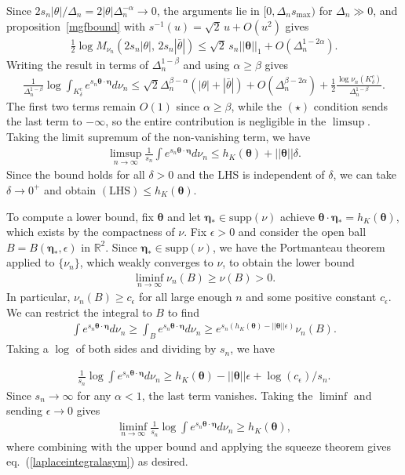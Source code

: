 \documentclass[a4paper,11pt]{article}
\theoremstyle{plain}
\theoremstyle{definition}
\theoremstyle{remark}
\newcommand{\bs}[1]{\boldsymbol{#1}}
\newcommand{\ba}{\begin{equation} \begin{aligned}}
\newcommand{\ea}{\end{aligned} \end{equation}}
\newcommand{\De}{\Delta}
\begin{document}
\begin{appendix}
Since $2s_n|\theta|/\De_n = 2|\theta|\De_n^{-\alpha} \to 0$, the arguments lie in $[0,\De_n s_{\max})$ for $\De_n \gg 0$, and proposition~\ref{mgfbound} with $s^{-1}(u) = \sqrt{2}\,u + O(u^2)$ gives
\ba
\frac{1}{2}\log M_{\nu_n}(2s_n|\theta|,\,2s_n|\bar{\theta}|) \leq \sqrt{2}\,s_n||\bs{\theta}||_1 + O(\De_n^{1-2\alpha}).
\ea
Writing the result in terms of $\De_n^{1-\beta}$ and using $\alpha \geq \beta$ gives
\ba
\frac{1}{\De_n^{1-\beta}}\log\int_{K_\delta^c} e^{s_n \bs{\theta}\cdot\bs{\eta}} d\nu_n \leq \sqrt{2}\De_n^{\beta-\alpha}(|\theta| + | \bar{\theta}|) + O(\De_n^{\beta-2\alpha}) +\frac{1}{2} \frac{\log\nu_n(K_\delta^c)}{\De_n^{1-\beta}}.
\ea
The first two terms remain $O(1)$ since $\alpha \geq \beta$, while the $(\star)$ condition sends the last term to $-\infty$, so the entire contribution is negligible in the $\limsup$. Taking the limit supremum of the non-vanishing term, we have
\ba
\limsup_{n\to\infty}\frac{1}{s_n}\int e^{s_n \bs{\theta}\cdot\bs{\eta} }d\nu_n \leq h_K(\bs{\theta}) + ||\bs{\theta}||\delta .
\ea
Since the bound holds for all $\delta>0$ and the LHS is independent of $\delta$, we can take $\delta \to 0^+$ and obtain $(\mathrm{LHS})\leq h_K(\bs{\theta})$.

To compute a lower bound, fix $\bs{\theta}$ and let $\bs{\eta}_* \in \text{supp}(\nu)$ achieve $\bs{\theta}\cdot\bs{\eta}_* = h_K(\bs{\theta})$, which exists by the compactness of $\nu$. Fix $\epsilon>0$ and consider the open ball $B = B(\bs{\eta}_*,\epsilon)$ in $\mathbb{R}^2$. Since $\bs{\eta}_*\in\text{supp}(\nu)$, we have the Portmanteau theorem applied to $\{\nu_n\}$, which weakly converges to $\nu$, to obtain the lower bound
\ba
\liminf_{n\to\infty} \nu_n(B) \geq \nu(B) >0.
\ea
In particular, $\nu_n(B) \geq c_\epsilon$ for all large enough $n$ and some positive constant $c_\epsilon$. We can restrict the integral to $B$ to find
\ba
\int e^{s_n \bs{\theta}\cdot \bs{\eta}} d\nu_n \geq \int_B e^{s_n \bs{\theta}\cdot \bs{\eta}} d\nu_n \geq e^{s_n(h_K(\bs{\theta}) - ||\bs{\theta}||\epsilon)}\nu_n(B).
\ea
Taking a $\log$ of both sides and dividing by $s_n$, we have

\ba
\frac{1}{s_n}\log \int e^{s_n \bs{\theta}\cdot \bs{\eta}} d\nu_n  \geq h_K(\bs{\theta}) -|| \bs{\theta}||\epsilon + \log(c_\epsilon)/s_n.
\ea
Since $s_n \to \infty$ for any $\alpha<1$, the last term vanishes. Taking the $\liminf$ and sending $\epsilon \to 0$ gives
\ba
\liminf_{n\to\infty}\frac{1}{s_n}\log \int e^{s_n \bs{\theta}\cdot \bs{\eta}} d\nu_n  \geq h_K(\bs{\theta}),
\ea
where combining with the upper bound and applying the squeeze theorem gives eq.~(\ref{laplaceintegralasym}) as desired.


\end{appendix}
\end{document}
